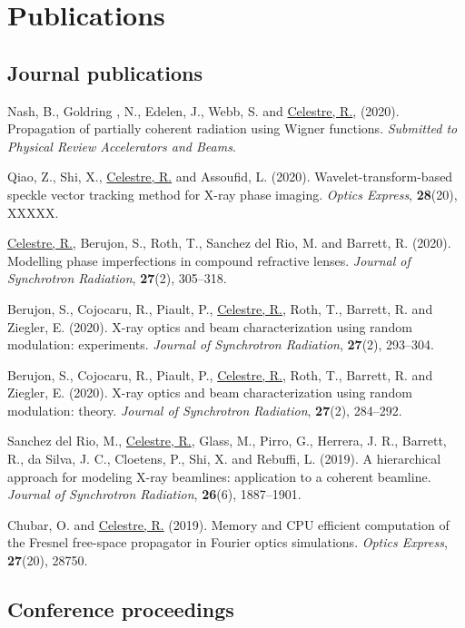 \appendix

\chapter{Publications}\label{sec:publications}

\section*{Journal publications}

Nash, B., Goldring , N., Edelen, J., Webb, S. and \underline{Celestre, R.}, (2020). Propagation of partially coherent radiation using Wigner functions. \textit{Submitted to Physical Review Accelerators and Beams}. 

Qiao, Z., Shi, X., \underline{Celestre, R.} and Assoufid, L. (2020). Wavelet-transform-based speckle vector tracking method for X-ray phase imaging. \textit{Optics Express}, \textbf{28}(20), XXXXX. 

\underline{Celestre, R.}, Berujon, S., Roth, T., Sanchez del Rio, M. and Barrett, R. (2020). Modelling phase imperfections in compound refractive lenses. \textit{Journal of Synchrotron Radiation}, \textbf{27}(2), 305–318. 

Berujon, S., Cojocaru, R., Piault, P., \underline{Celestre, R.}, Roth, T., Barrett, R. and Ziegler, E. (2020). X-ray optics and beam characterization using random modulation: experiments. \textit{Journal of Synchrotron Radiation}, \textbf{27}(2), 293–304.

Berujon, S., Cojocaru, R., Piault, P., \underline{Celestre, R.}, Roth, T., Barrett, R. and Ziegler, E. (2020). X-ray optics and beam characterization using random modulation: theory. \textit{Journal of Synchrotron Radiation}, \textbf{27}(2), 284–292.

Sanchez del Rio, M., \underline{Celestre, R.}, Glass, M., Pirro, G., Herrera, J. R., Barrett, R., da Silva, J. C., Cloetens, P., Shi, X. and Rebuffi, L. (2019). A hierarchical approach for modeling X-ray beamlines: application to a coherent beamline. \textit{Journal of Synchrotron Radiation}, \textbf{26}(6), 1887–1901.

Chubar, O. and \underline{Celestre, R.} (2019). Memory and CPU efficient computation of the Fresnel free-space propagator in Fourier optics simulations. \textit{Optics Express}, \textbf{27}(20), 28750. 

\section*{Conference proceedings}

